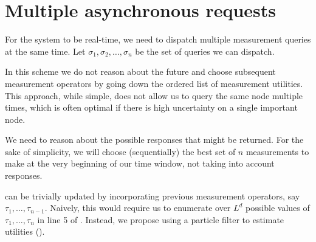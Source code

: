 \section{Multiple asynchronous requests}
\label{sec:async}

For the system to be real-time, we need to dispatch multiple measurement queries at the same time.
Let $\sigma_1, \sigma_2, \dots, \sigma_n$ be the set of queries we can dispatch.

\begin{note}
In this scheme we do not reason about the future and choose subsequent measurement operators by going down the ordered list of measurement utilities.
This approach, while simple, does not allow us to query the same node multiple times, which is often optimal if there is high uncertainty on a single important node.
\end{note}

We need to reason about the possible responses that might be returned.
For the sake of simplicity, we will choose (sequentially) the best set of $n$ measurements to make at the very beginning of our time window, not taking into account responses.

 can be trivially updated by incorporating previous measurement operators, say $\tau_1, \dots, \tau_{n-1}$.
Naively, this would require us to enumerate over $L^d$ possible values of $\tau_1, \dots, \tau_n$ in line 5 of .
Instead, we propose using a particle filter to estimate utilities ().

